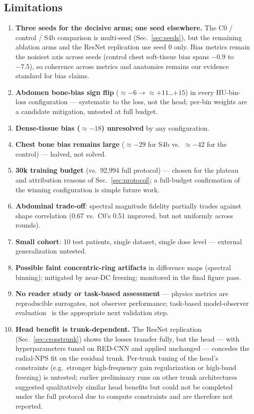 \subsection{Limitations}
\label{sec:limitations}

\begin{enumerate}
  \item \textbf{Three seeds for the decisive arms; one seed elsewhere.} The C0 / control / S4b comparison is multi-seed (Sec.~\ref{sec:seeds}), but the remaining ablation arms and the ResNet replication use seed 0 only. Bias metrics remain the noisiest axis across seeds (control chest soft-tissue bias spans $-0.9$ to $-7.5$\hu{}), so coherence across metrics and anatomies remains our evidence standard for bias claims.
  \item \textbf{Abdomen bone-bias sign flip} (${\approx}{-}6 \rightarrow {\approx}{+}11$\ldots${+}15$\hu{}) in every HU-bin-loss configuration --- systematic to the loss, not the head; per-bin weights are a candidate mitigation, untested at full budget.
  \item \textbf{Dense-tissue bias (${\approx}{-}18$\hu{}) unresolved} by any configuration.
  \item \textbf{Chest bone bias remains large} (${\approx}{-}29$\hu{} for S4b vs.\ ${\approx}{-}42$ for the control) --- halved, not solved.
  \item \textbf{30k training budget} (vs.\ 92{,}994 full protocol) --- chosen for the plateau and attribution reasons of Sec.~\ref{sec:protocol}; a full-budget confirmation of the winning configuration is simple future work.
  \item \textbf{Abdominal \npsc{} trade-off}: spectral magnitude fidelity partially trades against shape correlation (0.67 vs.\ C0's 0.51 improved, but not uniformly across rounds).
  \item \textbf{Small cohort}: 10 test patients, single dataset, single dose level --- external generalization untested.
  \item \textbf{Possible faint concentric-ring artifacts} in difference maps (spectral binning); mitigated by near-DC freezing; monitored in the final figure pass.
  \item \textbf{No reader study or task-based assessment} --- physics metrics are reproducible surrogates, not observer performance; task-based model-observer evaluation~\cite{xu2025} is the appropriate next validation step.
  \item \textbf{Head benefit is trunk-dependent.} The ResNet replication (Sec.~\ref{sec:crosstrunk}) shows the losses transfer fully, but the head --- with hyperparameters tuned on RED-CNN and applied unchanged --- concedes the radial-NPS fit on the residual trunk. Per-trunk tuning of the head's constraints (e.g.\ stronger high-frequency gain regularization or high-band freezing) is untested; earlier preliminary runs on other trunk architectures suggested qualitatively similar head benefits but could not be completed under the full protocol due to compute constraints and are therefore not reported.

\end{enumerate}
